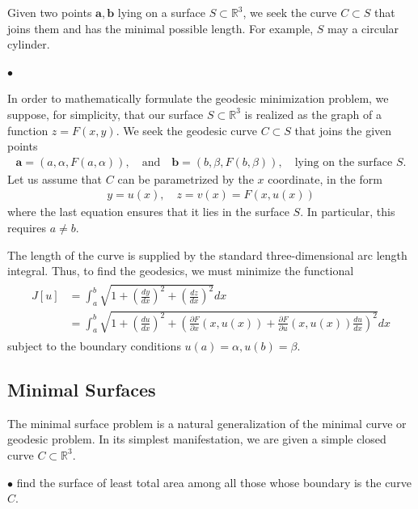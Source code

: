 \documentclass{article}
\begin{document}
 Given two points $\mathbf{a},\mathbf{b}$ lying on a surface $S \subset \mathbb{R}^{3}$, we seek the curve $C \subset S$ that joins them and has the minimal possible length. For example,  $S$ may a circular cylinder.

$\bullet$  

In order to mathematically formulate the geodesic minimization problem, we suppose, for simplicity, that our surface $S \subset \mathbb{R}^{3}$ is realized as the graph of a function $z=F(x, y)$. We seek the geodesic curve $C \subset S$ that joins the given points
\begin{align*}
    \mathbf{a}=(a, \alpha, F(a, \alpha)), \quad \text{and} \quad \mathbf{b}=(b, \beta, F(b, \beta)), \quad \text{lying on the surface } S.
\end{align*}
Let us assume that $C$ can be parametrized by the $x$ coordinate, in the form
\begin{align*}
y=u(x), \quad z=v(x)=F(x, u(x))
\end{align*}
where the last equation ensures that it lies in the surface $S$. In particular, this requires $a \neq b$. 

The length of the curve is supplied by the standard three-dimensional arc length integral. Thus, to find the geodesics, we must minimize the functional
\begin{align*}
\begin{aligned}
J[u] &=\int_{a}^{b} \sqrt{1+\left(\frac{d y}{d x}\right)^{2}+\left(\frac{d z}{d x}\right)^{2}} d x \\
&=\int_{a}^{b} \sqrt{1+\left(\frac{d u}{d x}\right)^{2}+\left(\frac{\partial F}{\partial x}(x, u(x))+\frac{\partial F}{\partial u}(x, u(x)) \frac{d u}{d x}\right)^{2}} d x
\end{aligned}
\end{align*}
subject to the boundary conditions $u(a)=\alpha, u(b)=\beta$. 
\subsection{Minimal Surfaces}
The minimal surface problem is a natural generalization of the minimal curve or geodesic problem. In its simplest manifestation, we are given a simple closed curve $C \subset \mathbb{R}^{3}$. 

$\bullet$  find the surface of least total area among all those whose boundary is the curve $C$. 
\end{document}
